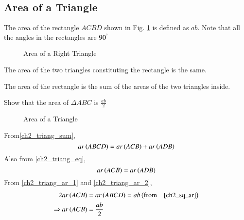 \subsection{Area of a Triangle}



\begin{definition}
	The area of the rectangle $ACBD$ shown in Fig. \ref{ch2_sq_ar} is defined as $ab$. Note that all the angles in the rectangles are $90^{\degree}$
	\label{ch2_sq_ar}
\end{definition}
\begin{figure}[!ht]
	\begin{center}
		
		\resizebox{\columnwidth}{!}{}
	\end{center}
	\caption{Area of a Right Triangle}
	\label{ch2_sq_ar}	
\end{figure}

\begin{definition}
	The area of the two triangles constituting the rectangle is the same.
	\label{ch2_triang_eq}
\end{definition}
\begin{definition}
	The area of the rectangle is the sum of the areas of the two triangles inside.
	\label{ch2_triang_sum}
\end{definition}

\begin{problem}
	Show that the area of $\Delta ABC$ is $\frac{ab}{2}$
\end{problem}
\begin{figure}[!ht]
	\begin{center}
		
		\resizebox{\columnwidth}{!}{}
	\end{center}
	\caption{Area of a Triangle}
	\label{ch2_triang_ar}	
\end{figure}

\proof From\eqref{ch2_triang_sum},
\begin{equation}
\label{ch2_triang_ar_1}
ar\left(ABCD\right) = ar\left(ACB\right) + ar\left(ADB\right)
\end{equation}
Also from \eqref{ch2_triang_eq},
\begin{equation}
\label{ch2_triang_ar_2}
ar\left(ACB\right) = ar\left(ADB\right)
\end{equation}
From \eqref{ch2_triang_ar_1} and \eqref{ch2_triang_ar_2},
\begin{align}
2ar\left(ACB\right) &= ar\left(ABCD\right) = ab \left(\text{from} \quad \eqref{ch2_sq_ar}\right)
\\
\Rightarrow ar\left(ACB\right) &= \frac{ab}{2}
\end{align}

